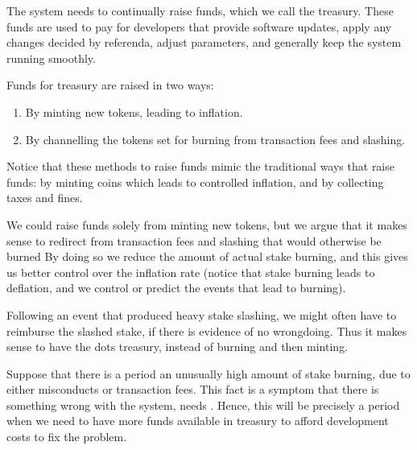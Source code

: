  The system needs to continually raise funds, which we call the treasury.
 These funds are used to pay for developers that provide software updates, apply any changes decided by referenda, adjust parameters, and generally keep the system running smoothly.

Funds for treasury are raised in two ways:

{
\begin{enumerate}
\item By minting new tokens, leading to inflation.
\item By channelling the tokens set for burning from transaction fees and slashing.
\end{enumerate}
}

 
Notice that these methods to raise funds mimic the traditional ways that  raise funds: by minting coins which leads to controlled inflation, and by collecting taxes and fines.

We could raise funds solely from minting new tokens, but we argue that it makes sense to redirect  from transaction fees and slashing that would otherwise be burned
By doing so\eray{}{,} we reduce the amount of actual stake burning, and this gives us better control over the inflation rate (notice that stake burning leads to deflation, and we  control or predict the events that lead to burning).

Following an event that produced heavy stake slashing, we might often have to reimburse the slashed stake, if there is evidence of no wrongdoing. Thus\eray{}{,} it makes sense to have the dots  treasury, instead of burning and then minting.

Suppose that there is a period  an unusually high amount of stake burning, due to either misconducts or transaction fees. This fact is a symptom that there is something wrong with the system,  needs . Hence, this will be precisely a period when we need to have more funds available in  treasury to afford   development costs to fix the problem.


